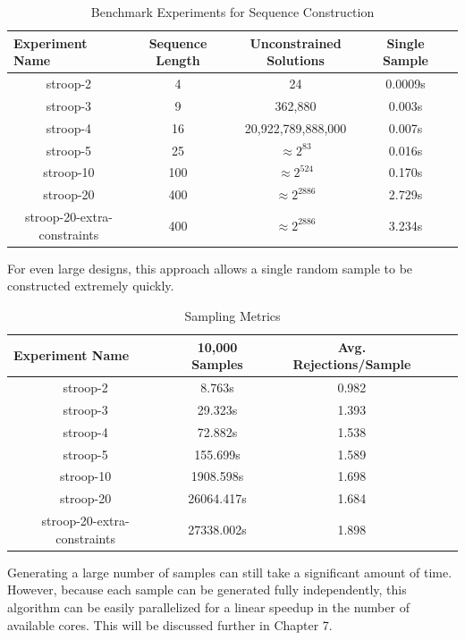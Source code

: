 \begin{table}[htb]
  \centering
  \caption{Benchmark Experiments for Sequence Construction}
\begin{tabular}{|c|c|c|c|c|}
\hline
\multicolumn{1}{|l|}{Experiment Name} & Sequence Length & Unconstrained Solutions  & Single Sample  \\ \hline
stroop-2                              & 4               & 24                       & 0.0009s        \\ \hline
stroop-3                              & 9               & 362,880                  & 0.003s         \\ \hline
stroop-4                              & 16              & 20,922,789,888,000       & 0.007s         \\ \hline
stroop-5                              & 25              & $\approx 2^{83}$         & 0.016s         \\ \hline
stroop-10                             & 100             & $\approx 2^{524}$        & 0.170s         \\ \hline
stroop-20                             & 400             & $\approx 2^{2886}$       & 2.729s         \\ \hline
stroop-20-extra-constraints           & 400             & $\approx 2^{2886}$       & 3.234s         \\ \hline
\end{tabular}
\label{tab:benchmark_experiments_construction}
\end{table}

For even large designs, this approach allows a single random sample to be constructed extremely quickly.

\begin{table}[htb]
  \centering
  \caption{Sampling Metrics}
\begin{tabular}{|c|c|c|c|c|}
\hline
\multicolumn{1}{|l|}{Experiment Name} & 10,000 Samples & Avg. Rejections/Sample  \\ \hline
stroop-2                              & 8.763s         & 0.982                   \\ \hline
stroop-3                              & 29.323s        & 1.393                   \\ \hline
stroop-4                              & 72.882s        & 1.538                   \\ \hline
stroop-5                              & 155.699s       & 1.589                   \\ \hline
stroop-10                             & 1908.598s      & 1.698                   \\ \hline
stroop-20                             & 26064.417s     & 1.684                   \\ \hline
stroop-20-extra-constraints           & 27338.002s     & 1.898                   \\ \hline
\end{tabular}
\label{tab:sampling_metrics}
\end{table}

Generating a large number of samples can still take a significant amount of time. However, because each sample can be generated fully independently, this algorithm can be easily parallelized for a linear speedup in the number of available cores. This will be discussed further in Chapter 7.

